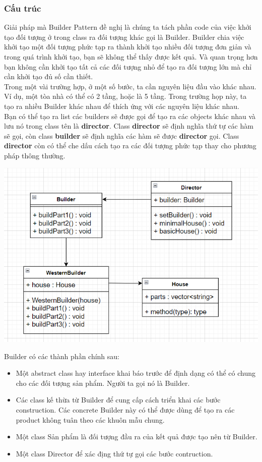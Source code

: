 \subsubsection{Cấu trúc}
Giải pháp mà Builder Pattern đề nghị là chúng ta tách phần code của việc khởi tạo đối tượng ở trong class ra đối tượng khác gọi là Builder. Builder chia việc khởi tạo một đối tượng phức tạp ra thành khởi tạo nhiều đối tượng đơn giản và trong quá trình khởi tạo, bạn sẽ không thể thấy được kết quả. Và quan trọng hơn bạn không cần khởi tạo tất cả các đối tượng nhỏ để tạo ra đối tượng lớn mà chỉ cần khởi tạo đủ số cần thiết.\\
Trong một vài trường hợp, ở một số bước, ta cần nguyên liệu đầu vào khác nhau. Ví dụ, một tòa nhà có thể có 2 tầng, hoặc là 5 tầng. Trong trường họp này, ta tạo ra nhiều Builder khác nhau để thích ứng với các nguyên liệu khác nhau.\\
Bạn có thể tạo ra list các builders sẽ được gọi để tạo ra các objects khác nhau và lưu nó trong class tên là \textbf{director}. Class \textbf{director} sẽ định nghĩa thứ tự các hàm sẽ gọi, còn class \textbf{builder} sẽ định nghĩa các hàm sẽ được \textbf{director} gọi. Class \textbf{director} còn có thể che dấu cách tạo ra các đối tượng phức tạp thay cho phương pháp thông thường.\\
\begin{center}
  \includegraphics[scale=0.65]{image/creational/bso.png}  
\end{center}
Builder có các thành phần chính sau:
\begin{itemize}
    \item Một abstract class hay interface khai báo trước để định dạng có thể có chung cho các đối tượng sản phẩm. Người ta gọi nó là Builder.
    \item Các class kế thừa từ Builder để cung cấp cách triển khai các bước construction. Các concrete Builder này có thể được dùng để tạo ra các product không tuân theo các khuôn mẫu chung.
    \item Một class Sản phẩm là đối tượng đầu ra của kết quả được tạo nên từ Builder.
    \item Một class Director để xác địng thứ tự gọi các bước contruction.
\end{itemize}
